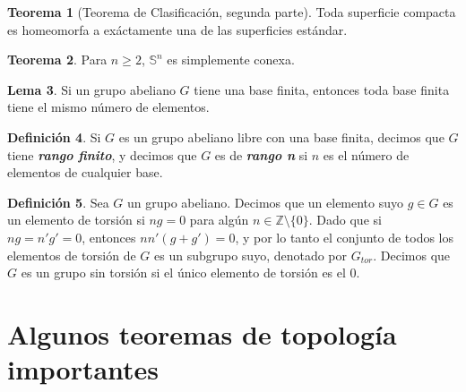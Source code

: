 \documentclass[10pt]{report}
\newcommand{\enfatiza}[1]{\textbf{\textit{#1}}}
\theoremstyle{definition}
\newtheorem{defin}{Definición}[section]
\newtheorem{tma}[defin]{Teorema}
\newtheorem{lema}[defin]{Lema}
\begin{document}
\begin{tma}[Teorema de Clasificación, segunda parte]
Toda superficie compacta es homeomorfa a exáctamente una de las superficies estándar.
\end{tma}

\begin{tma}
Para $n\geq 2$, $\mathbb{S}^n$ es simplemente conexa.
\end{tma}

\begin{lema}
Si un grupo abeliano $G$ tiene una base finita, entonces toda base finita tiene el mismo número de elementos.
\end{lema}


\begin{defin}
Si $G$ es un grupo abeliano libre con una base finita, decimos que $G$ tiene \enfatiza{rango finito}, y decimos que $G$ es de \enfatiza{rango n} si $n$ es el número de elementos de cualquier base.
\end{defin}

\begin{defin}
Sea $G$ un grupo abeliano. Decimos que un elemento suyo $g\in G$ es un elemento de torsión si $ng=0$ para algún $n\in \mathbb{Z}\setminus \{ 0 \}$. Dado que si $ng=n'g'=0$, entonces $nn'(g+g')=0$, y por lo tanto el conjunto de todos los elementos de torsión de $G$ es un subgrupo suyo, denotado por $G_{tor}$. Decimos que $G$ es un grupo sin torsión si el único elemento de torsión es el 0. 
\end{defin}


\appendix
\chapter{Algunos teoremas de topología importantes}
\end{document}
